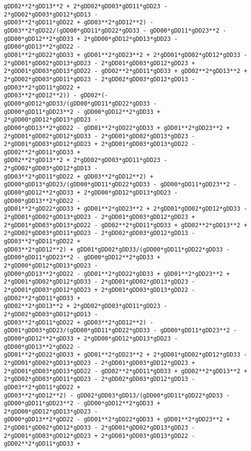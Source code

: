 \documentclass[landscape,letterpaper,10pt,english]{article}
\begin{document}
\begin{Verbatim}[commandchars=\\\{\}]
gDD02**2*gDD13**2 + 2*gDD02*gDD03*gDD11*gDD23 - 2*gDD02*gDD03*gDD12*gDD13 -
gDD03**2*gDD11*gDD22 + gDD03**2*gDD12**2) -
gDD03**2*gDD22/(gDD00*gDD11*gDD22*gDD33 - gDD00*gDD11*gDD23**2 -
gDD00*gDD12**2*gDD33 + 2*gDD00*gDD12*gDD13*gDD23 - gDD00*gDD13**2*gDD22 -
gDD01**2*gDD22*gDD33 + gDD01**2*gDD23**2 + 2*gDD01*gDD02*gDD12*gDD33 -
2*gDD01*gDD02*gDD13*gDD23 - 2*gDD01*gDD03*gDD12*gDD23 +
2*gDD01*gDD03*gDD13*gDD22 - gDD02**2*gDD11*gDD33 + gDD02**2*gDD13**2 +
2*gDD02*gDD03*gDD11*gDD23 - 2*gDD02*gDD03*gDD12*gDD13 - gDD03**2*gDD11*gDD22 +
gDD03**2*gDD12**2)) - gDD02*(-gDD00*gDD12*gDD33/(gDD00*gDD11*gDD22*gDD33 -
gDD00*gDD11*gDD23**2 - gDD00*gDD12**2*gDD33 + 2*gDD00*gDD12*gDD13*gDD23 -
gDD00*gDD13**2*gDD22 - gDD01**2*gDD22*gDD33 + gDD01**2*gDD23**2 +
2*gDD01*gDD02*gDD12*gDD33 - 2*gDD01*gDD02*gDD13*gDD23 -
2*gDD01*gDD03*gDD12*gDD23 + 2*gDD01*gDD03*gDD13*gDD22 - gDD02**2*gDD11*gDD33 +
gDD02**2*gDD13**2 + 2*gDD02*gDD03*gDD11*gDD23 - 2*gDD02*gDD03*gDD12*gDD13 -
gDD03**2*gDD11*gDD22 + gDD03**2*gDD12**2) +
gDD00*gDD13*gDD23/(gDD00*gDD11*gDD22*gDD33 - gDD00*gDD11*gDD23**2 -
gDD00*gDD12**2*gDD33 + 2*gDD00*gDD12*gDD13*gDD23 - gDD00*gDD13**2*gDD22 -
gDD01**2*gDD22*gDD33 + gDD01**2*gDD23**2 + 2*gDD01*gDD02*gDD12*gDD33 -
2*gDD01*gDD02*gDD13*gDD23 - 2*gDD01*gDD03*gDD12*gDD23 +
2*gDD01*gDD03*gDD13*gDD22 - gDD02**2*gDD11*gDD33 + gDD02**2*gDD13**2 +
2*gDD02*gDD03*gDD11*gDD23 - 2*gDD02*gDD03*gDD12*gDD13 - gDD03**2*gDD11*gDD22 +
gDD03**2*gDD12**2) + gDD01*gDD02*gDD33/(gDD00*gDD11*gDD22*gDD33 -
gDD00*gDD11*gDD23**2 - gDD00*gDD12**2*gDD33 + 2*gDD00*gDD12*gDD13*gDD23 -
gDD00*gDD13**2*gDD22 - gDD01**2*gDD22*gDD33 + gDD01**2*gDD23**2 +
2*gDD01*gDD02*gDD12*gDD33 - 2*gDD01*gDD02*gDD13*gDD23 -
2*gDD01*gDD03*gDD12*gDD23 + 2*gDD01*gDD03*gDD13*gDD22 - gDD02**2*gDD11*gDD33 +
gDD02**2*gDD13**2 + 2*gDD02*gDD03*gDD11*gDD23 - 2*gDD02*gDD03*gDD12*gDD13 -
gDD03**2*gDD11*gDD22 + gDD03**2*gDD12**2) -
gDD01*gDD03*gDD23/(gDD00*gDD11*gDD22*gDD33 - gDD00*gDD11*gDD23**2 -
gDD00*gDD12**2*gDD33 + 2*gDD00*gDD12*gDD13*gDD23 - gDD00*gDD13**2*gDD22 -
gDD01**2*gDD22*gDD33 + gDD01**2*gDD23**2 + 2*gDD01*gDD02*gDD12*gDD33 -
2*gDD01*gDD02*gDD13*gDD23 - 2*gDD01*gDD03*gDD12*gDD23 +
2*gDD01*gDD03*gDD13*gDD22 - gDD02**2*gDD11*gDD33 + gDD02**2*gDD13**2 +
2*gDD02*gDD03*gDD11*gDD23 - 2*gDD02*gDD03*gDD12*gDD13 - gDD03**2*gDD11*gDD22 +
gDD03**2*gDD12**2) - gDD02*gDD03*gDD13/(gDD00*gDD11*gDD22*gDD33 -
gDD00*gDD11*gDD23**2 - gDD00*gDD12**2*gDD33 + 2*gDD00*gDD12*gDD13*gDD23 -
gDD00*gDD13**2*gDD22 - gDD01**2*gDD22*gDD33 + gDD01**2*gDD23**2 +
2*gDD01*gDD02*gDD12*gDD33 - 2*gDD01*gDD02*gDD13*gDD23 -
2*gDD01*gDD03*gDD12*gDD23 + 2*gDD01*gDD03*gDD13*gDD22 - gDD02**2*gDD11*gDD33 +

\end{Verbatim}
\end{document}
